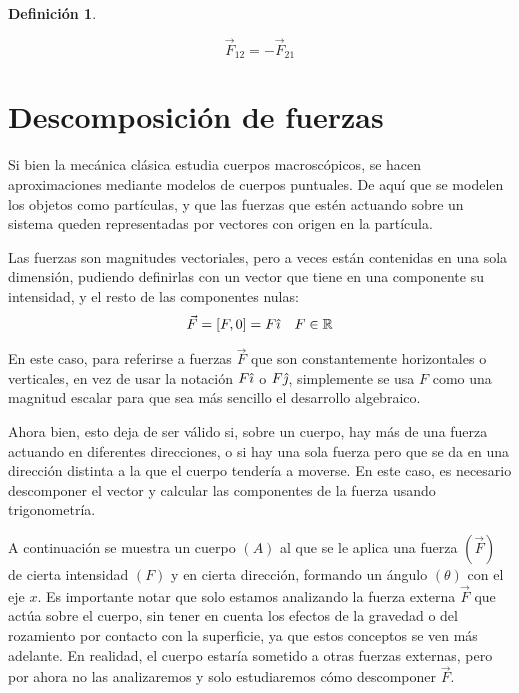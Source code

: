 \documentclass[a5paper,12pt,twoside]{book}
\newtheorem{defn}{{Definición}}[chapter]
\begin{document}
\begin{mdframed}[style=MyFrame1]
    \begin{defn}
        \label{defn:NewtonThirdLaw}
    \end{defn}
    \begin{equation*}
        \Vec{F}_{12} = -\Vec{F}_{21}
    \end{equation*}
\end{mdframed}


\section{Descomposición de fuerzas}

Si bien la mecánica clásica estudia cuerpos macroscópicos, se hacen aproximaciones mediante modelos de cuerpos puntuales. De aquí que se modelen los objetos como partículas, y que las fuerzas que estén actuando sobre un sistema queden representadas por vectores con origen en la partícula.

Las fuerzas son magnitudes vectoriales, pero a veces están contenidas en una sola dimensión, pudiendo definirlas con un vector que tiene en una componente su intensidad, y el resto de las componentes nulas:
\[
  \Vec{F} = \left[ F,0 \right] = F \hat{\imath} \quad F \in \mathbb{R}
\]

En este caso, para referirse a fuerzas $\Vec{F}$ que son constantemente horizontales o verticales, en vez de usar la notación $F \hat{\imath}$ o $F \hat{\jmath}$, simplemente se usa $F$ como una magnitud escalar para que sea más sencillo el desarrollo algebraico.

Ahora bien, esto deja de ser válido si, sobre un cuerpo, hay más de una fuerza actuando en diferentes direcciones, o si hay una sola fuerza pero que se da en una dirección distinta a la que el cuerpo tendería a moverse. En este caso, es necesario descomponer el vector y calcular las componentes de la fuerza usando trigonometría.

A continuación se muestra un cuerpo $(A)$ al que se le aplica una fuerza $(\Vec{F})$ de cierta intensidad $(F)$ y en cierta dirección, formando un ángulo $(\theta)$ con el eje $x$. Es importante notar que solo estamos analizando la fuerza externa $\Vec{F}$ que actúa sobre el cuerpo, sin tener en cuenta los efectos de la gravedad o del rozamiento por contacto con la superficie, ya que estos conceptos se ven más adelante. En realidad, el cuerpo estaría sometido a otras fuerzas externas, pero por ahora no las analizaremos y solo estudiaremos cómo descomponer $\Vec{F}$.
\end{document}
